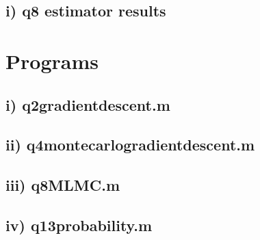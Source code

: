 \documentclass[10pt]{article}
\begin{document}
\subsection*{i) q8 estimator results}

\newpage
\section*{Programs}
\bigskip
\subsection*{i) q2\textunderscore gradient\textunderscore descent.m}

\bigskip\bigskip\bigskip
\subsection*{ii) q4\textunderscore monte\textunderscore carlo\textunderscore gradient\textunderscore descent.m}

\newpage
\subsection*{iii) q8\textunderscore MLMC.m}

\newpage
\subsection*{iv) q13\textunderscore probability.m}

\end{document}
